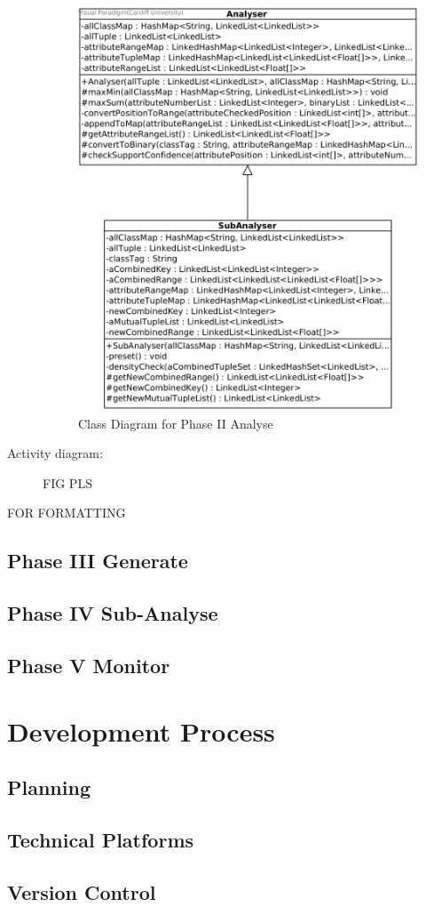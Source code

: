 \begin{description}
\begin{figure}[!htbp]
    \centering
    \includegraphics[width=4in]{figures/class_analyser}
    \caption[Class Diagram for Phase II Analyse]{Class Diagram for Phase II Analyse}
    \label{fig:figure4_3}
\end{figure}

\item[Activity diagram: ] 

FIG PLS
\end{description}


FOR FORMATTING

\subsection{Phase III Generate}

\subsection{Phase IV Sub-Analyse}

\subsection{Phase V Monitor}

\section{Development Process}

\subsection{Planning}
\subsection{Technical Platforms}
\subsection{Version Control}





